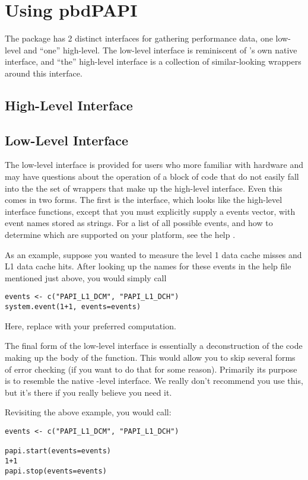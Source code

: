 \section{Using pbdPAPI}

The \thispackage package has 2 distinct interfaces for gathering performance data, one low-level 
and ``one'' high-level.  The low-level interface is reminiscent of \PAPI's own native \C interface, 
and ``the'' high-level interface is a collection of similar-looking wrappers around this interface.


\subsection{High-Level Interface}




\subsection{Low-Level Interface}

The low-level interface is provided for users who more familiar with hardware and may have 
questions about the operation of a block of code that do not easily fall into the the set of 
wrappers that make up the high-level interface.  Even this comes in two forms.  The first is the 
 interface, which looks like the high-level interface functions, except that 
you must explicitly supply a \PAPI events vector, with event names stored as strings.  For a list 
of all possible events, and how to determine which are supported on your platform, see the \R help 
.

As an example, suppose you wanted to measure the level 1 data cache misses and L1 data cache hits. 
After looking up the names for these events in the help file mentioned just above, you would simply 
call
\begin{lstlisting}
events <- c("PAPI_L1_DCM", "PAPI_L1_DCH")
system.event(1+1, events=events)
\end{lstlisting}

Here, replace  with your preferred computation.

The final form of the low-level interface is essentially a deconstruction of the code making up the 
body of the  function.  This would allow you to skip several forms of error 
checking (if you want to do that for some reason).  Primarily its purpose is to resemble the 
native \C-level \PAPI interface.  We really don't recommend you use this, but it's there if you 
really believe you need it.

Revisiting the above example, you would call:
\begin{lstlisting}
events <- c("PAPI_L1_DCM", "PAPI_L1_DCH")

papi.start(events=events)
1+1
papi.stop(events=events)
\end{lstlisting}